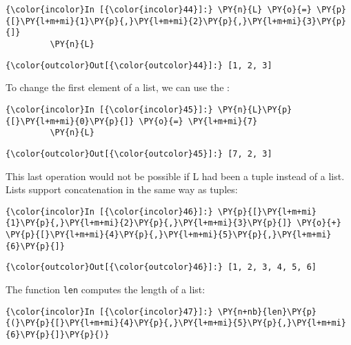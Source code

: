 \begin{Verbatim}[commandchars=\\\{\}]
{\color{incolor}In [{\color{incolor}44}]:} \PY{n}{L} \PY{o}{=} \PY{p}{[}\PY{l+m+mi}{1}\PY{p}{,}\PY{l+m+mi}{2}\PY{p}{,}\PY{l+m+mi}{3}\PY{p}{]}
         \PY{n}{L}
\end{Verbatim}


\begin{Verbatim}[commandchars=\\\{\}]
{\color{outcolor}Out[{\color{outcolor}44}]:} [1, 2, 3]
\end{Verbatim}
To change the first element of a list, we can use the :

\begin{Verbatim}[commandchars=\\\{\}]
{\color{incolor}In [{\color{incolor}45}]:} \PY{n}{L}\PY{p}{[}\PY{l+m+mi}{0}\PY{p}{]} \PY{o}{=} \PY{l+m+mi}{7}
         \PY{n}{L}
\end{Verbatim}

\begin{Verbatim}[commandchars=\\\{\}]
{\color{outcolor}Out[{\color{outcolor}45}]:} [7, 2, 3]
\end{Verbatim}
This last operation would not be possible if L had been a tuple instead
of a list. Lists support concatenation in the same way as tuples:

\begin{Verbatim}[commandchars=\\\{\}]
{\color{incolor}In [{\color{incolor}46}]:} \PY{p}{[}\PY{l+m+mi}{1}\PY{p}{,}\PY{l+m+mi}{2}\PY{p}{,}\PY{l+m+mi}{3}\PY{p}{]} \PY{o}{+} \PY{p}{[}\PY{l+m+mi}{4}\PY{p}{,}\PY{l+m+mi}{5}\PY{p}{,}\PY{l+m+mi}{6}\PY{p}{]}
\end{Verbatim}


\begin{Verbatim}[commandchars=\\\{\}]
{\color{outcolor}Out[{\color{outcolor}46}]:} [1, 2, 3, 4, 5, 6]
\end{Verbatim}
The function \texttt{len} computes the length of a list:

\begin{Verbatim}[commandchars=\\\{\}]
{\color{incolor}In [{\color{incolor}47}]:} \PY{n+nb}{len}\PY{p}{(}\PY{p}{[}\PY{l+m+mi}{4}\PY{p}{,}\PY{l+m+mi}{5}\PY{p}{,}\PY{l+m+mi}{6}\PY{p}{]}\PY{p}{)}
\end{Verbatim}

